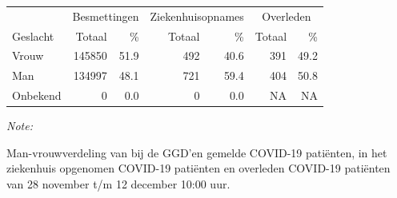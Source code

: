 \documentclass[
  english,
  man,floatsintext]{apa6}
\begin{document}
\begin{table}
\centering\begingroup\fontsize{11}{13}\selectfont

\begin{threeparttable}
\begin{tabular}{lrrrrrr}
\toprule
\multicolumn{1}{c}{ } & \multicolumn{2}{c}{Besmettingen} & \multicolumn{2}{c}{Ziekenhuisopnames} & \multicolumn{2}{c}{Overleden} \\
\cmidrule(l{3pt}r{3pt}){2-3} \cmidrule(l{3pt}r{3pt}){4-5} \cmidrule(l{3pt}r{3pt}){6-7}
Geslacht & Totaal & \% & Totaal & \% & Totaal & \%\\
\midrule
Vrouw & 145850 & 51.9 & 492 & 40.6 & 391 & 49.2\\
Man & 134997 & 48.1 & 721 & 59.4 & 404 & 50.8\\
Onbekend & 0 & 0.0 & 0 & 0.0 & NA & NA\\
\bottomrule
\end{tabular}
\begin{tablenotes}
\item \textit{Note: } 
\item Man-vrouwverdeling van bij de GGD’en gemelde COVID-19 patiënten, in het ziekenhuis opgenomen COVID-19 patiënten en overleden COVID-19 patiënten van 28 november t/m 12 december 10:00 uur.
\end{tablenotes}
\end{threeparttable}
\endgroup{}
\end{table}
\newpage
\end{document}
